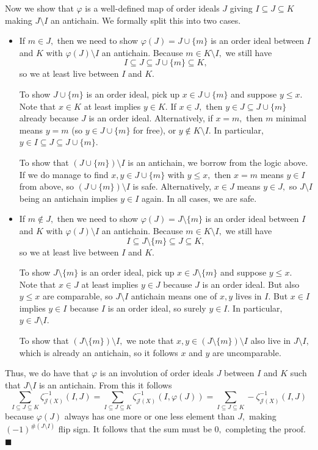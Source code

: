 Now we show that $\varphi$ is a well-defined map of order ideals $J$ giving $I\subseteq J\subseteq K$ making $J\setminus I$ an antichain. We formally split this into two cases.
\begin{itemize}
    \item If $m\in J,$ then we need to show $\varphi(J)=J\cup\{m\}$ is an order ideal between $I$ and $K$ with $\varphi(J)\setminus I$ an antichain. Because $m\in K\setminus I,$ we still have
    \[I\subseteq J\subseteq J\cup\{m\}\subseteq K,\]
    so we at least live between $I$ and $K.$
    
    To show $J\cup\{m\}$ is an order ideal, pick up $x\in J\cup\{m\}$ and suppose $y\le x.$ Note that $x\in K$ at least implies $y\in K.$ If $x\in J,$ then $y\in J\subseteq J\cup\{m\}$ already because $J$ is an order ideal. Alternatively, if $x=m,$ then $m$ minimal means $y=m$ (so $y\in J\cup\{m\}$ for free), or $y\notin K\setminus I.$ In particular, $y\in I\subseteq J\subseteq J\cup\{m\}.$
    
    To show that $(J\cup\{m\})\setminus I$ is an antichain, we borrow from the logic above. If we do manage to find $x,y\in J\cup\{m\}$ with $y\le x,$ then $x=m$ means $y\in I$ from above, so $(J\cup\{m\})\setminus I$ is safe. Alternatively, $x\in J$ means $y\in J,$ so $J\setminus I$ being an antichain implies $y\in I$ again. In all cases, we are safe.
    
    \item If $m\notin J,$ then we need to show $\varphi(J)=J\setminus\{m\}$ is an order ideal between $I$ and $K$ with $\varphi(J)\setminus I$ an antichain. Because $m\in K\setminus I,$ we still have
    \[I\subseteq J\setminus\{m\}\subseteq J\subseteq K,\]
    so we at least live between $I$ and $K.$
    
    To show $J\setminus\{m\}$ is an order ideal, pick up $x\in J\setminus\{m\}$ and suppose $y\le x.$ Note that $x\in J$ at least implies $y\in J$ because $J$ is an order ideal. But also $y\le x$ are comparable, so $J\setminus I$ antichain means one of $x,y$ lives in $I.$ But $x\in I$ implies $y\in I$ because $I$ is an order ideal, so surely $y\in I.$ In particular, $y\in J\setminus I.$
    
    To show that $(J\setminus\{m\})\setminus I,$ we note that $x,y\in(J\setminus\{m\})\setminus I$ also live in $J\setminus I,$ which is already an antichain, so it follows $x$ and $y$ are uncomparable.
\end{itemize}
Thus, we do have that $\varphi$ is an involution of order ideals $J$ between $I$ and $K$ such that $J\setminus I$ is an antichain. From this it follows
\[\sum_{I\subseteq J\subseteq K}\zeta_{\mathcal J(X)}^{-1}(I,J)=\sum_{I\subseteq J\subseteq K}\zeta_{\mathcal J(X)}^{-1}(I,\varphi(J))=\sum_{I\subseteq J\subseteq K}-\zeta_{\mathcal J(X)}^{-1}(I,J)\]
because $\varphi(J)$ always has one more or one less element than $J,$ making $(-1)^{\#(J\setminus I)}$ flip sign. It follows that the sum must be $0,$ completing the proof. $\blacksquare$


